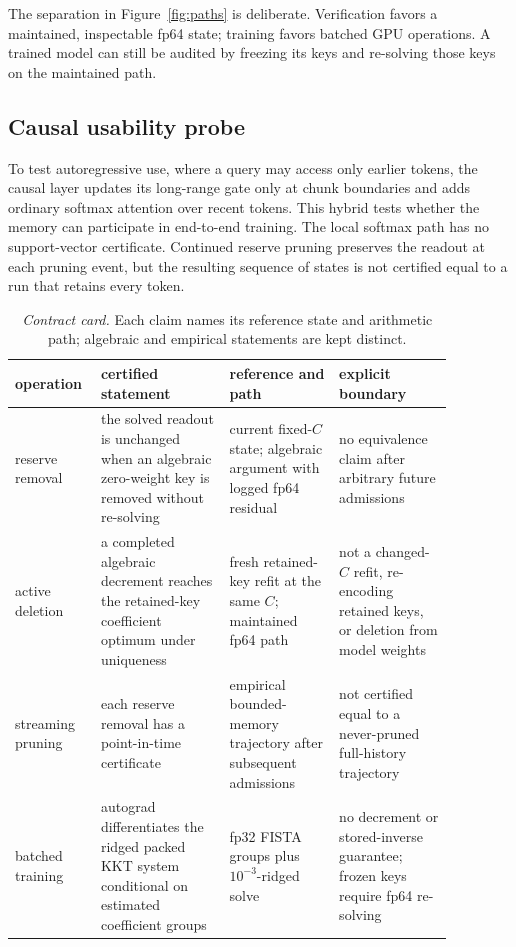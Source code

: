 The separation in Figure~\ref{fig:paths} is deliberate. Verification favors a
maintained, inspectable fp64 state; training favors batched GPU operations. A
trained model can still be audited by freezing its keys and
re-solving those keys on the maintained path.

\subsection{Causal usability probe}\label{sec:method-hybrid}

To test autoregressive use, where a query may access only earlier tokens, the
causal layer updates its long-range gate only at chunk boundaries and adds
ordinary softmax attention over recent tokens. This hybrid tests whether the memory can participate in end-to-end
training. The local softmax path has no support-vector certificate. Continued
reserve pruning preserves the readout at each pruning event, but the resulting
sequence of states is not certified equal to a run that retains every token.

\begin{table}[t]
\centering
\footnotesize
\caption{\emph{Contract card.} Each claim names its reference state and
arithmetic path; algebraic and empirical statements are kept distinct.}
\label{tab:contract}
\begin{tabular}{@{}
>{\raggedright\arraybackslash}p{0.13\linewidth}
>{\raggedright\arraybackslash}p{0.27\linewidth}
>{\raggedright\arraybackslash}p{0.23\linewidth}
>{\raggedright\arraybackslash}p{0.24\linewidth}@{}}
\toprule
operation & certified statement & reference and path & explicit boundary \\
\midrule
reserve removal &
the solved readout is unchanged when an algebraic zero-weight key is removed
without re-solving &
current fixed-\(C\) state; algebraic argument with logged fp64 residual &
no equivalence claim after arbitrary future admissions \\
\addlinespace
active deletion &
a completed algebraic decrement reaches the retained-key coefficient optimum under uniqueness &
fresh retained-key refit at the same \(C\); maintained fp64 path &
not a changed-\(C\) refit, re-encoding retained keys, or deletion from model weights \\
\addlinespace
streaming pruning &
each reserve removal has a point-in-time certificate &
empirical bounded-memory trajectory after subsequent admissions &
not certified equal to a never-pruned full-history trajectory \\
\addlinespace
batched training &
autograd differentiates the ridged packed KKT system conditional on estimated coefficient groups &
fp32 FISTA groups plus \(10^{-3}\)-ridged solve &
no decrement or stored-inverse guarantee; frozen keys require fp64 re-solving \\
\bottomrule
\end{tabular}
\end{table}

